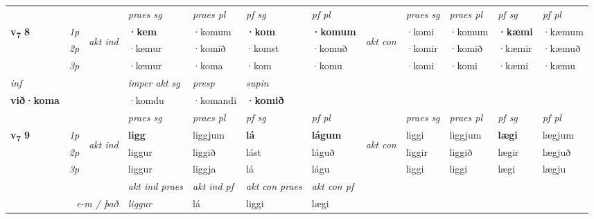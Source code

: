 \begin{longtable}[l]{X>{\footnotesize\itshape}llXXXXlXXXX}
 & &   & \textit{praes sg}  & \textit{praes pl}    & \textit{ pf sg} & \textit{pf pl} & & \textit{praes sg}  & \textit{praes pl}    & \textit{pf sg} & \textit{pf pl }  \\ \cmidrule{4-7} \cmidrule{9-12}
 \multirow{2}{*}{{{\textbf{v{\textsubscript{7}}} \Large{\textbf{8}}}}}  & 1p & \multirow{3}{*}{\begin{turn}{90}\textit{akt ind}\end{turn}} & \textbf{·kem} & ·komum & \textbf{·kom} & \textbf{·komum} & \multirow{3}{*}{\begin{turn}{90}\textit{akt con}\end{turn}} &·komi & ·komum & \textbf{·kæmi} & ·kæmum\\*
 & 2p &  &  ·kemur  & ·komið & ·komst & ·komuð & & ·komir & ·komið & ·kæmir & ·kæmuð \\*
 & 3p &  & ·kemur & ·koma & ·kom & ·komu & & ·komi & ·komi& ·kæmi & ·kæmu \\*
\cmidrule{4-7} \cmidrule{9-12}

   {\textit{inf}} & &  & \textit{imper akt sg}    & \textit{presp} & \textit{supin}   \\*
  {\textbf{við\allowbreak ·koma}} & && ·komdu     & ·komandi &  \textbf{·komið}   \\*

\midrule

 & &   & \textit{praes sg}  & \textit{praes pl}    & \textit{ pf sg} & \textit{pf pl} & & \textit{praes sg}  & \textit{praes pl}    & \textit{pf sg} & \textit{pf pl }  \\ \cmidrule{4-7} \cmidrule{9-12}
 \multirow{2}{*}{{{\textbf{v{\textsubscript{7}}} \Large{\textbf{9}}}}}  & 1p & \multirow{3}{*}{\begin{turn}{90}\textit{akt ind}\end{turn}} & \textbf{ligg} & liggjum & \textbf{lá} & \textbf{lágum} & \multirow{3}{*}{\begin{turn}{90}\textit{akt con}\end{turn}} &liggi & liggjum & \textbf{lægi} & lægjum\\*
 & 2p &  &  liggur  & liggið & lást & láguð & & liggir & liggið & lægir & lægjuð \\*
 & 3p &  & liggur & liggja & lá & lágu & & liggi & liggi& lægi & lægju \\*
\cmidrule{4-7} \cmidrule{9-12}

   && &  \textit{akt ind praes} & \textit{akt ind pf} & \textit{akt con praes} & \textit{akt con pf} \\*
\multicolumn{3}{r}{\textit{e-m / það}} & liggur & lá & liggi & lægi \\*


\end{longtable}
